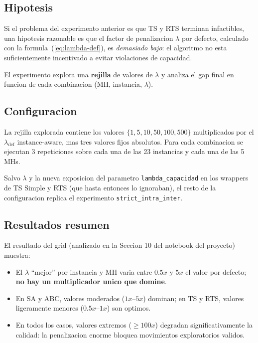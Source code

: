 \subsection{Hipotesis}

Si el problema del experimento anterior es que TS y RTS terminan
infactibles, una hipotesis razonable es que el factor de penalizacion
$\lambda$ por defecto, calculado con la formula~(\ref{eq:lambda-def}),
es \emph{demasiado bajo}: el algoritmo no esta suficientemente
incentivado a evitar violaciones de capacidad.

El experimento explora una \textbf{rejilla} de valores de $\lambda$ y
analiza el gap final en funcion de cada combinacion (MH, instancia,
$\lambda$).

\subsection{Configuracion}

La rejilla explorada contiene los valores
$\{1, 5, 10, 50, 100, 500\}$ multiplicados por el $\lambda_{\text{def}}$
instance-aware, mas tres valores fijos absolutos. Para cada
combinacion se ejecutan 3 repeticiones sobre cada una de las 23
instancias y cada una de las 5 MHs.

Salvo $\lambda$ y la nueva exposicion del parametro
\texttt{lambda\_capacidad} en los wrappers de TS Simple y RTS (que
hasta entonces lo ignoraban), el resto de la configuracion replica el
experimento \texttt{strict\_intra\_inter}.

\subsection{Resultados resumen}

El resultado del grid (analizado en la Seccion 10 del notebook del
proyecto) muestra:

\begin{itemize}
\item El $\lambda$ ``mejor'' por instancia y MH varia entre $0.5x$ y
  $5x$ el valor por defecto; \textbf{no hay un multiplicador unico que
  domine}.
\item En SA y ABC, valores moderados ($1x$--$5x$) dominan; en TS y RTS,
  valores ligeramente menores ($0.5x$--$1x$) son optimos.
\item En todos los casos, valores extremos ($\ge 100x$) degradan
  significativamente la calidad: la penalizacion enorme bloquea
  movimientos exploratorios validos.
\end{itemize}

